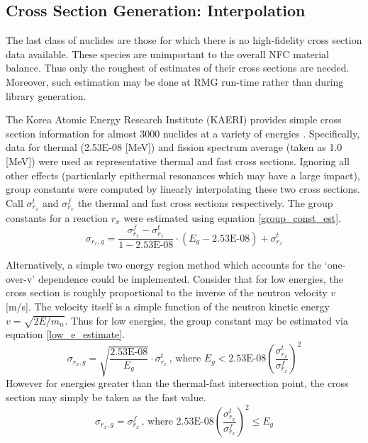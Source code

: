 \subsection{Cross Section Generation: Interpolation}
\label{mg:xs_gen_interpolation}
The last class of nuclides are those for which there is no high-fidelity cross section data 
available.  These species are unimportant to the overall NFC material balance. 
Thus only the roughest of estimates of their cross sections are needed.  Moreover, such estimation 
may be done at RMG run-time rather than during library generation.

The Korea Atomic Energy Research Institute (KAERI) provides simple cross section information
for almost 3000 nuclides at a variety of energies \cite{KAER2000}.  Specifically, data for
thermal (2.53E-08 [MeV]) and fission spectrum average (taken as 1.0 [MeV]) were used as representative
thermal and fast cross sections.  Ignoring all other effects (particularly epithermal resonances which 
may have a large impact),  group constants were computed by linearly interpolating these two cross sections.  
Call $\sigma_{r_x}^t$ and $\sigma_{r_x}^f$ the thermal and fast cross sections respectively.  The group
constants for a reaction $r_x$ were estimated using equation \ref{group_const_est}.
\begin{equation}
\label{group_const_est}
\sigma_{r_x,g} = \frac{\sigma_{r_x}^f - \sigma_{r_x}^t}{1 - \mbox{2.53E-08}} \cdot (E_g - \mbox{2.53E-08}) + \sigma_{r_x}^t
\end{equation}

Alternatively, a simple two energy region method which accounts for the `one-over-v' dependence
could be implemented.  Consider that for low energies, the cross section is roughly proportional 
to the inverse of the neutron velocity $v$ [m/s].  The velocity itself is a simple function of 
the neutron kinetic energy $v = \sqrt{2E/m_n}$.  Thus for low energies, the group constant may 
be estimated via equation \ref{low_e_estimate}.
\begin{equation}
\label{low_e_estimate}
\sigma_{r_x,g} = \sqrt{\frac{\mbox{2.53E-08}}{E_g}} \cdot \sigma_{r_x}^t \, \mbox{, where } E_g < \mbox{2.53E-08} \left(\frac{\sigma_{r_x}^t}{\sigma_{r_x}^f}\right)^2
\end{equation}
However for energies greater than the thermal-fast intersection point, the cross section may simply be taken as 
the fast value.
\begin{equation}
\label{high_e_estimate}
\sigma_{r_x,g} = \sigma_{r_x}^f \, \mbox{, where } \mbox{2.53E-08} \left(\frac{\sigma_{r_x}^t}{\sigma_{r_x}^f}\right)^2 \le E_g
\end{equation}





